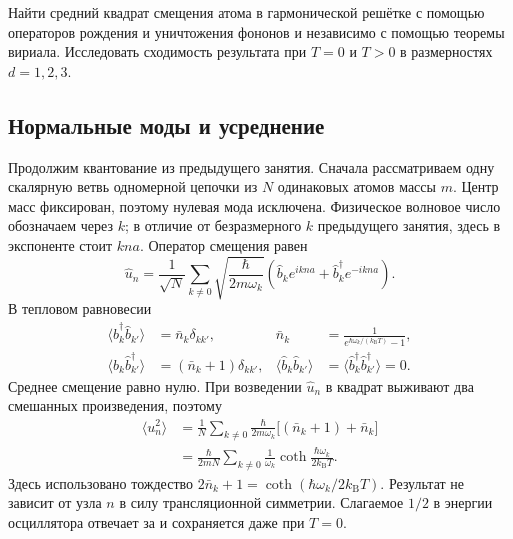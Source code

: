 \documentclass[../final.tex]{subfiles}
\begin{document}

\begingroup
\renewcommand{\thesection}{4.\arabic{section}}
\label{task:fksv_displacements}

\condition
Найти средний квадрат смещения атома в гармонической решётке
с помощью операторов рождения и уничтожения фононов и независимо
с помощью теоремы вириала. Исследовать сходимость результата при
$T=0$ и $T>0$ в размерностях $d=1,2,3$.

\solution

\subsection*{Нормальные моды и усреднение}

Продолжим квантование из предыдущего занятия. Сначала рассматриваем
одну скалярную ветвь одномерной цепочки из $N$ одинаковых атомов массы $m$.
Центр масс фиксирован, поэтому нулевая мода исключена.
Физическое волновое число обозначаем через $k$; в отличие от
безразмерного $k$ предыдущего занятия, здесь в экспоненте стоит $kna$.
Оператор смещения равен
\[
    \hat u_n=\frac1{\sqrt N}\sum_{k\ne0}
       \sqrt{\frac{\hbar}{2m\omega_k}}
       \left(\hat b_k e^{ikna}+\hat b_k^\dagger e^{-ikna}\right).
\]
В тепловом равновесии
\begin{align*}
    \langle\hat b_k^\dagger\hat b_{k'}\rangle
       &=\bar n_k\delta_{kk'},&
    \bar n_k&=\frac1{e^{\hbar\omega_k/(k_{\mathrm B}T)}-1},\\
    \langle\hat b_k\hat b_{k'}^\dagger\rangle
       &=(\bar n_k+1)\delta_{kk'},&
    \langle\hat b_k\hat b_{k'}\rangle
       &=\langle\hat b_k^\dagger\hat b_{k'}^\dagger\rangle=0.
\end{align*}
Среднее смещение равно нулю. При возведении $\hat u_n$ в квадрат
выживают два смешанных произведения, поэтому
\begin{align*}
    \langle u_n^2\rangle
       &=\frac1N\sum_{k\ne0}\frac{\hbar}{2m\omega_k}
           \bigl[(\bar n_k+1)+\bar n_k\bigr]\\
       &=\frac{\hbar}{2mN}\sum_{k\ne0}\frac1{\omega_k}
           \coth\frac{\hbar\omega_k}{2k_{\mathrm B}T}.
\end{align*}
Здесь использовано тождество $2\bar n_k+1=\coth(\hbar\omega_k/2k_{\mathrm B}T)$.
Результат не зависит от узла $n$ в силу трансляционной симметрии.
Слагаемое $1/2$ в энергии осциллятора отвечает за
 и сохраняется даже при $T=0$.
\end{document}
